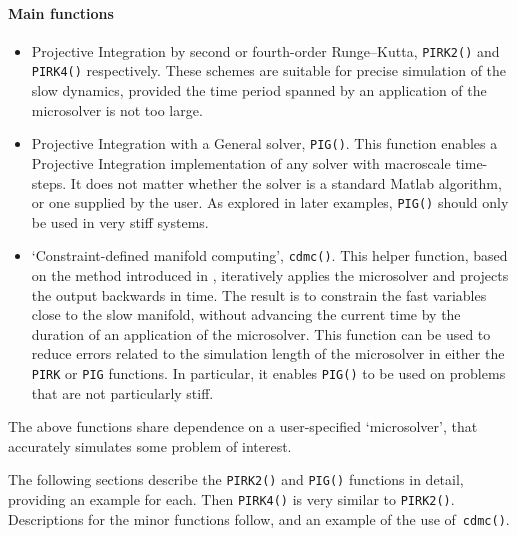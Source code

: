 \paragraph{Main functions}
\begin{itemize}
\item Projective Integration by second or fourth-order Runge--Kutta, \verb|PIRK2()| and \verb|PIRK4()| respectively.
These schemes are suitable for precise simulation of the slow dynamics, provided the time period spanned by an application of the microsolver is not too large.

\item Projective Integration with a General solver, \verb|PIG()|.
This function enables a Projective Integration implementation of any solver with macroscale time-steps.
It does not matter whether the solver is a standard Matlab algorithm, or one supplied by the user.
As explored in later examples, \verb|PIG()| should only be used in very stiff systems. 

\item `Constraint-defined manifold computing', \verb|cdmc()|.
This helper function, based on the method introduced in \cite{Gear04},  iteratively applies the microsolver and projects the output backwards in time.
The result is to constrain the fast variables close to the slow manifold, without advancing the current time by the duration of an application of the microsolver.
This function can be used to reduce errors related to the simulation length of the microsolver in either the \verb|PIRK| or \verb|PIG| functions.
In particular, it enables \verb|PIG()| to be used on problems that are not particularly stiff.
\end{itemize}

The above functions share dependence on a user-specified `microsolver', that accurately simulates some problem of interest. 


The following sections describe the \verb|PIRK2()| and \verb|PIG()| functions in detail, providing an example for each.
Then \verb|PIRK4()| is very similar to \verb|PIRK2()|.
Descriptions for the minor functions follow, and an example of the use of~\verb|cdmc()|.







